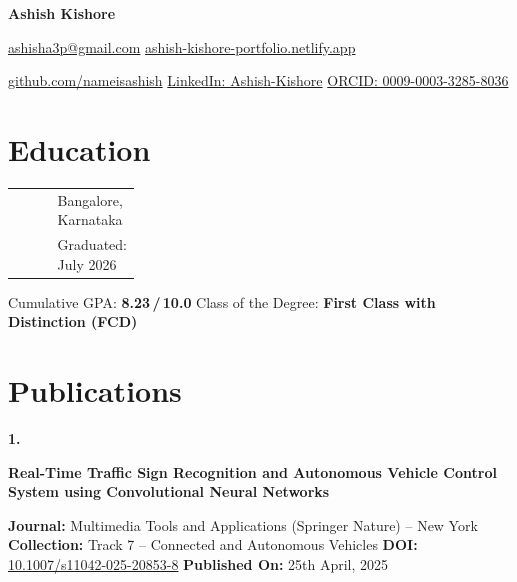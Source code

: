\documentclass[letterpaper,10pt]{article}
\makeatletter
\renewcommand{\small}{\fontsize{9}{11}\selectfont}
\renewcommand{\footnotesize}{\fontsize{8.5}{10.2}\selectfont}
\newcommand{\dsep}{\unskip\penalty0\hspace{0.35em}\textcolor{RuleGrey}{\textbar}\hspace{0.35em}\allowbreak}
\newcommand{\hsep}{\hspace{0.45em}\textcolor{RuleGrey}{\textbar}\hspace{0.45em}}
\newcommand{\Entry}[4]{%
  \begin{tabularx}{\linewidth}{@{}>{\RaggedRight\arraybackslash}X@{\hspace{1em}}>{\RaggedLeft\arraybackslash}p{0.25\linewidth}@{}}
    {\bfseries\color{NavyBlue}#1} & {\small\color{SubtleGrey}#2}\\[2pt]
    {\small\itshape\color{AccentBlue}#3} & {\small\color{SubtleGrey}#4}
  \end{tabularx}\par\vspace{2pt}%
}
\newcommand{\Pub}[3]{%
  \begin{list}{}{%
    \setlength{\leftmargin}{1.5em}\setlength{\labelwidth}{1.1em}%
    \setlength{\labelsep}{0.4em}\setlength{\itemindent}{0pt}%
    \setlength{\listparindent}{0pt}\setlength{\rightmargin}{0pt}%
    \setlength{\topsep}{3pt}\setlength{\parsep}{0pt}\setlength{\partopsep}{0pt}}
    \item[{\small\bfseries\color{AccentBlue}#1.}]%
      {\raggedright\small\bfseries\color{NavyBlue}#2\par}\vspace{2pt}
      {\raggedright\footnotesize\color{SubtleGrey}#3\par}
  \end{list}%
}
\makeatother
\begin{document}
\setlength{\fboxsep}{0pt}%
\noindent\colorbox{HeaderBg}{%
  \begin{minipage}{\linewidth}
    \centering
    \vspace*{8pt}\par
    {\fontsize{27}{31}\selectfont\sffamily\bfseries\color{white}Ashish Kishore}\par
    \vspace{6pt}
    {\small\color{HeaderTint}%
      \href{mailto:ashisha3p@gmail.com}{\color{HeaderTint}ashisha3p@gmail.com} \hsep
      \href{https://ashish-kishore-portfolio.netlify.app/}{\color{HeaderTint}ashish-kishore-portfolio.netlify.app}\par}
    \vspace{3.5pt}
    {\small\color{HeaderTint}%
      \href{https://github.com/nameisashish}{\color{HeaderTint}github.com/nameisashish} \hsep
      \href{https://linkedin.com/in/ashish-kishore-6b56a51b3}{\color{HeaderTint}LinkedIn: Ashish-Kishore} \hsep
      \href{https://orcid.org/0009-0003-3285-8036}{\color{HeaderTint}ORCID: 0009-0003-3285-8036}\par}
    \vspace*{8pt}
  \end{minipage}%
}\par
\nointerlineskip
\noindent{\color{AccentBlue}\rule{\linewidth}{2.5pt}}\par

\section{Education}

\Entry{Bangalore Institute of Technology}{Bangalore, Karnataka}%
      {Bachelor of Engineering in Electronics and Telecommunication}{Graduated: July 2026}

{\small Cumulative GPA: \textbf{8.23\,/\,10.0} \dsep Class of the Degree: \textbf{First Class with Distinction (FCD)}\par}

\section{Publications}

\Pub{1}{Real-Time Traffic Sign Recognition and Autonomous Vehicle Control System using Convolutional Neural Networks}{%
  \textbf{Journal:} Multimedia Tools and Applications (Springer Nature) -- New York \dsep
  \textbf{Collection:} Track 7 -- Connected and Autonomous Vehicles \dsep
  \textbf{DOI:} \href{https://doi.org/10.1007/s11042-025-20853-8}{\color{SubtleGrey}10.1007/s11042-025-20853-8} \dsep
  \textbf{Published On:} 25th April, 2025}
\end{document}

